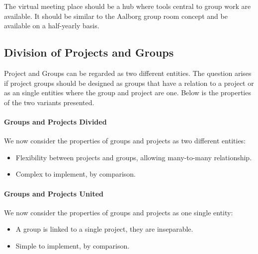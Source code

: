 The virtual meeting place should be a hub where tools central to group work are available.
It should be similar to the Aalborg group room concept and be available on a half-yearly basis.


\subsection{Division of Projects and Groups}
\label{sub:divProjGroup}
Project and Groups can be regarded as two different entities.
The question arises if project groups should be designed as groups that have a relation to a project or as an single entities where the group and project are one.
Below is the properties of the two variants presented.


\paragraph{Groups and Projects Divided} We now consider the properties of groups and projects as two different entities:
\begin{itemize}
	\item Flexibility between projects and groups, allowing many-to-many relationship.
	\item Complex to implement, by comparison.
\end{itemize}


\paragraph{Groups and Projects United} We now consider the properties of groups and projects as one single entity:
\begin{itemize}
	\item A group is linked to a single project, they are inseparable.
	\item Simple to implement, by comparison.
\end{itemize}

